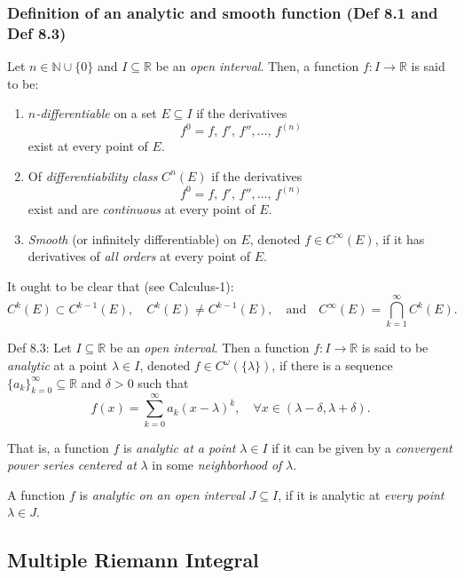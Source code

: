 \subsubsection{Definition of an analytic and smooth function (Def 8.1 and Def 8.3)}

Let $n \in \mathbb{N} \cup \{0\}$ and $I \subseteq \mathbb{R}$ be an \textit{open interval}. Then, a function $f: I \to \mathbb{R}$ is said to be:
\begin{enumerate}
    \item \textit{$n$-differentiable} on a set $E \subseteq I$ if the derivatives
    \[
        f^{0} = f, \, f', \, f'', \dots, \, f^{(n)}
    \]
    exist at every point of $E$.

    \item Of \textit{differentiability class} $C^n(E)$ if the derivatives
    \[
        f^{0} = f, \, f', \, f'', \dots, \, f^{(n)}
    \]
    exist and are \textit{continuous} at every point of $E$.

    \item \textit{Smooth} (or infinitely differentiable) on $E$, denoted $f \in C^\infty(E)$, if it has derivatives of \textit{all orders} at every point of $E$.
\end{enumerate}

It ought to be clear that (see Calculus-1):
\[
    C^k(E) \subset C^{k-1}(E), \quad C^k(E) \neq C^{k-1}(E), \quad \text{and} \quad C^\infty(E) = \bigcap_{k=1}^\infty C^k(E).
\]

Def 8.3:
Let $I \subseteq \mathbb{R}$ be an \textit{open interval}. Then a function $f: I \to \mathbb{R}$ is said to be \textit{analytic} at a point $\lambda \in I$, denoted $f \in C^\omega(\{\lambda\})$, if there is a sequence $\{a_k\}_{k=0}^\infty \subseteq \mathbb{R}$ and $\delta > 0$ such that
\[
    f(x) = \sum_{k=0}^\infty a_k (x - \lambda)^k, \quad \forall x \in (\lambda - \delta, \lambda + \delta).
\]

That is, a function $f$ is \textit{analytic at a point} $\lambda \in I$ if it can be given by a \textit{convergent power series centered at} $\lambda$ in some \textit{neighborhood of} $\lambda$.

A function $f$ is \textit{analytic on an open interval} $J \subseteq I$, if it is analytic at \textit{every point} $\lambda \in J$.

\clearpage

\subsection{Multiple Riemann Integral}

